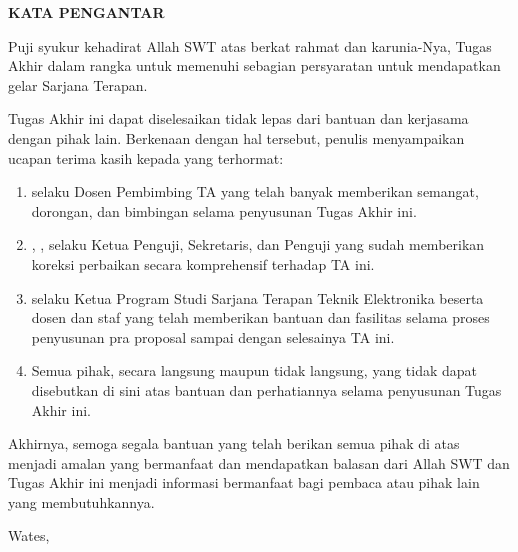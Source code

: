 \clearpage
{}
{}
\begin{center}
    \textbf{\large KATA PENGANTAR}\\[3em]
\end{center}

Puji syukur kehadirat Allah SWT atas berkat rahmat dan karunia-Nya, Tugas Akhir dalam rangka untuk memenuhi sebagian persyaratan untuk mendapatkan gelar Sarjana Terapan.

Tugas Akhir ini dapat diselesaikan tidak lepas dari bantuan dan kerjasama dengan pihak lain. Berkenaan dengan hal tersebut, penulis menyampaikan ucapan terima kasih kepada yang terhormat:

\begin{enumerate}
    \item {\pembimbing} selaku Dosen Pembimbing TA yang telah banyak memberikan semangat, dorongan, dan bimbingan selama penyusunan Tugas Akhir ini.
    \item {\pembimbing}, {\sekretaris}, {\penguji} selaku Ketua Penguji, Sekretaris, dan Penguji yang sudah  memberikan koreksi perbaikan secara komprehensif terhadap TA ini.
    \item {\koorprodi} selaku Ketua Program Studi Sarjana Terapan Teknik Elektronika beserta dosen dan staf yang telah memberikan bantuan dan fasilitas selama proses penyusunan pra proposal sampai dengan selesainya TA ini.
    \item Semua pihak, secara langsung maupun tidak langsung, yang tidak dapat disebutkan di sini atas bantuan dan perhatiannya selama penyusunan Tugas Akhir ini.
\end{enumerate}

Akhirnya, semoga segala bantuan yang telah berikan semua pihak di atas menjadi amalan yang bermanfaat dan mendapatkan balasan dari Allah SWT dan Tugas Akhir ini menjadi informasi bermanfaat bagi pembaca atau pihak lain yang membutuhkannya.

\begin{flushright}
    Wates, \tglpengesahan\\[1.25cm]
    \penulis \\
    \nim
\end{flushright}